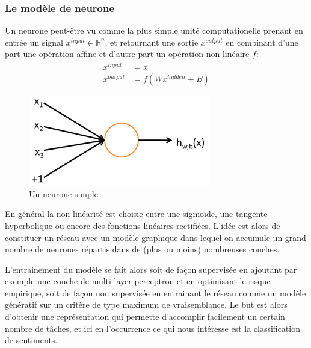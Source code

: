 \documentclass[conference]{IEEEtran}
\begin{document}
\subsubsection{Le modèle de neurone}
Un neurone peut-être vu comme la plus simple unité computationelle prenant en entrée un signal $x^{input}\in\mathbb{R}^n$, et retournant une sortie $x^{output}$ en combinant d'une part une opération affine et d'autre part un opération non-linéaire $f$:
\begin{align*}
x^{input}&=x \\
x^{output}&=f(Wx^{hidden}+B)
\end{align*}
\begin{figure}[H]
\centering
\includegraphics[width=0.75\columnwidth]{fig/SingleNeuron.png}
\caption{Un neurone simple}
\label{Neurone}
\end{figure}
En général la non-linéarité est choisie entre une sigmoïde, une tangente hyperbolique ou encore des fonctions linéaires rectifiées. L'idée est alors de constituer un réseau avec un modèle graphique dans lequel on accumule un grand nombre de neurones répartis dans de (plus ou moins) nombreuses couches.

L'entrainement du modèle se fait alors soit de façon supervisée en ajoutant par exemple une couche de multi-layer perceptron et en optimisant le risque empirique, soit de façon non supervisée en entrainant le réseau comme un modèle génératif sur un critère de type maximum de vraisemblance. Le but est alors d'obtenir une représentation qui permette d'accomplir facilement un certain nombre de tâches, et ici en l'occurrence ce qui nous intéresse est la classification de sentiments.
\end{document}
